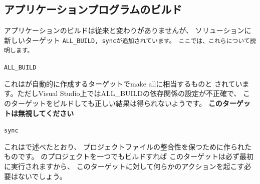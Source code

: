 \subsection{アプリケーションプログラムのビルド}
\label{subsec:BuildApplication}

\noindent
アプリケーションのビルドは従来と変わりがありませんが、
ソリューションに新しいターゲット
\tt{ALL\_BUILD}, \tt{sync}が追加されています。
ここでは、これらについて説明します。

\medskip
\noindent
\tt{ALL\_BUILD}
\begin{narrow}[20pt]
	これは\cmake が自動的に作成するターゲットでmake allに相当するものと
	されています。ただしVisual Studio上ではALL\_BUILDの依存関係の設定が不正確で、
	このターゲットをビルドしても正しい結果は得られないようです。
	{\bf{このターゲットは無視してください}}
\end{narrow}


\noindent
\tt{sync}
\begin{narrow}[20pt]
	これはで述べたとおり、
	プロジェクトファイルの整合性を保つために作られたものです。
	\SprLib のプロジェクトを一つでもビルドすれば
	このターゲットは必ず最初に実行されますから、
	このターゲットに対して何らかのアクションを起こす必要はないでしょう。
\end{narrow}

